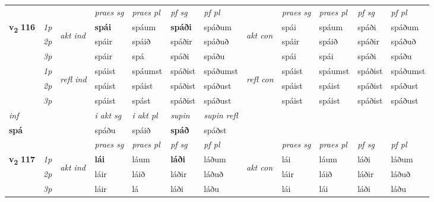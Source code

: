 \begin{longtable}[l]{X>{\footnotesize\itshape}llXXXXlXXXX}
 & &   & \textit{praes sg}  & \textit{praes pl}    & \textit{ pf sg} & \textit{pf pl} & & \textit{praes sg}  & \textit{praes pl}    & \textit{pf sg} & \textit{pf pl }  \\ \cmidrule{4-7} \cmidrule{9-12}
 \multirow{2}{*}{{{\textbf{v{\textsubscript{2}}} \Large{\textbf{116}}}}}  & 1p & \multirow{3}{*}{\begin{turn}{90}\textit{akt ind}\end{turn}} & \textbf{spái} & spáum & \textbf{spáði} & spáðum & \multirow{3}{*}{\begin{turn}{90}\textit{akt con}\end{turn}} &spái & spáum & spáði & spáðum\\*
 & 2p &  &  spáir  & spáið & spáðir & spáðuð & & spáir & spáið & spáðir & spáðuð \\*
 & 3p &  & spáir & spá & spáði & spáðu & & spái & spái& spáði & spáðu \\*
\cmidrule{4-7} \cmidrule{9-12}
 & 1p & \multirow{3}{*}{\begin{turn}{90}\textit{refl ind}\end{turn}}  & spáist & spáumst & spáðist & spáðumst & \multirow{3}{*}{\begin{turn}{90}\textit{refl con}\end{turn}}  &spáist & spáumst & spáðist & spáðumst \\*
 & 2p &  & spáist & spáist & spáðist & spáðust & &spáist & spáist & spáðist & spáðust \\*
 & 3p  & & spáist & spást & spáðist & spáðust & & spáist & spáist& spáðist & spáðust \\*
\cmidrule{4-7} \cmidrule{9-12}

   {\textit{inf}} & &  & \textit{i akt sg} & \textit{i akt pl}    & \textit{supin} & \textit{supin refl}  \\*
  {\textbf{spá}} & && spáðu  & spáið    &  \textbf{spáð} & spáðst  \\*

\midrule

 & &   & \textit{praes sg}  & \textit{praes pl}    & \textit{ pf sg} & \textit{pf pl} & & \textit{praes sg}  & \textit{praes pl}    & \textit{pf sg} & \textit{pf pl }  \\ \cmidrule{4-7} \cmidrule{9-12}
 \multirow{2}{*}{{{\textbf{v{\textsubscript{2}}} \Large{\textbf{117}}}}}  & 1p & \multirow{3}{*}{\begin{turn}{90}\textit{akt ind}\end{turn}} & \textbf{lái} & láum & \textbf{láði} & láðum & \multirow{3}{*}{\begin{turn}{90}\textit{akt con}\end{turn}} &lái & láum & láði & láðum\\*
 & 2p &  &  láir  & láið & láðir & láðuð & & láir & láið & láðir & láðuð \\*
 & 3p &  & láir & lá & láði & láðu & & lái & lái& láði & láðu \\*
\cmidrule{4-7} \cmidrule{9-12}


\end{longtable}
